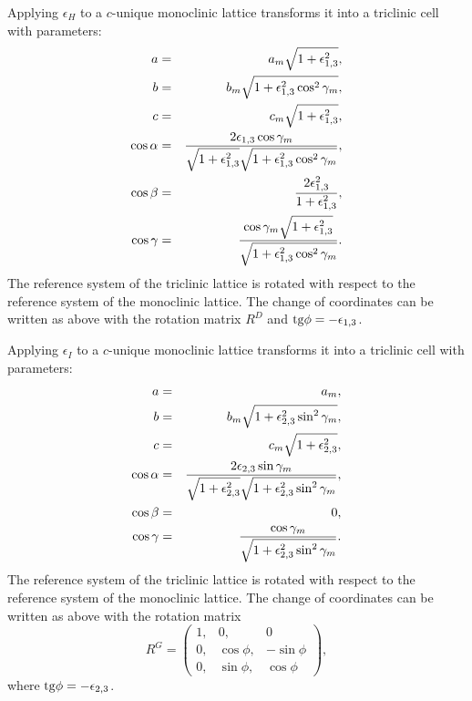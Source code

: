 \documentclass[12pt,a4paper,twoside]{report}
\begin{document}
Applying $\epsilon_H$ to a $c$-unique monoclinic lattice transforms
it into a triclinic cell with parameters:
\begin{eqnarray}
a&=&a_m \sqrt{1+\epsilon_{1,3}^2}, \\
b&=&b_m \sqrt{1+\epsilon_{1,3}^2 \cos^2\gamma_m}, \\
c&=&c_m \sqrt{1+\epsilon_{1,3}^2}, \\
\cos\alpha &=& {2 \epsilon_{1,3} \cos\gamma_m \over 
\sqrt{1+\epsilon_{1,3}^2} \sqrt{1+\epsilon_{1,3}^2 \cos^2\gamma_m}}, \\
\cos\beta &=& {2 \epsilon_{1,3}^2 \over 1+\epsilon_{1,3}^2}, \\
\cos\gamma &=& {\cos\gamma_m \sqrt{1+\epsilon_{1,3}^2} \over
\sqrt{1+\epsilon_{1,3}^2 \cos^2\gamma_m}}.
\end{eqnarray}
The reference system of the triclinic lattice is rotated 
with respect to the reference system of the  
monoclinic lattice. 
The change of coordinates can be written as above with the rotation matrix 
$R^D$ and ${\rm tg}\phi=-\epsilon_{1,3}$.

Applying $\epsilon_I$ to a $c$-unique monoclinic lattice transforms
it into a triclinic cell with parameters:
\begin{eqnarray}
a&=&a_m,  \\
b&=&b_m \sqrt{1+\epsilon_{2,3}^2 \sin^2\gamma_m}, \\
c&=&c_m \sqrt{1+\epsilon_{2,3}^2}, \\
\cos\alpha &=& {2 \epsilon_{2,3} \sin\gamma_m \over 
\sqrt{1+\epsilon_{2,3}^2} \sqrt{1+\epsilon_{2,3}^2 \sin^2\gamma_m}}, \\
\cos\beta &=& 0, \\
\cos\gamma &=& { \cos\gamma_m  \over
\sqrt{1+\epsilon_{2,3}^2 \sin^2\gamma_m}}.
\end{eqnarray}
The reference system of the triclinic lattice is rotated 
with respect to the reference system of the  
monoclinic lattice. 
The change of coordinates can be written as above with the rotation matrix 
\begin{equation}
R^G=\left( \begin{array}{ccc}
1, & 0, & 0 \\
0, & \cos \phi, &  -\sin \phi
\\
0, & \sin \phi, & \cos \phi 
\end{array}
\right),
\end{equation}
where  ${\rm tg}\phi=-\epsilon_{2,3}$.
\end{document}

